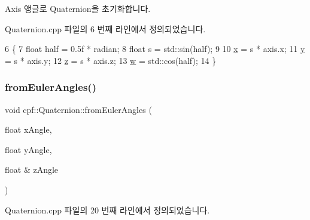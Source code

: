 Axis 앵글로 Quaternion을 초기화합니다. 

Quaternion.\+cpp 파일의 6 번째 라인에서 정의되었습니다.


\begin{DoxyCode}
6                                                                     \{
7         \textcolor{keywordtype}{float} half = 0.5f * radian;
8         \textcolor{keywordtype}{float} s = std::sin(half);
9 
10         \hyperlink{classcpf_1_1_quaternion_a200f7bce4e673281af8cc7dd75cb0677}{x} = s * axis.x;
11         \hyperlink{classcpf_1_1_quaternion_a4fbade6e58be55a49c94e7f157988136}{y} = s * axis.y;
12         \hyperlink{classcpf_1_1_quaternion_ade9c41b717605118e5fdf95d96a843b4}{z} = s * axis.z;
13         \hyperlink{classcpf_1_1_quaternion_af312a196b39bb4903b876bc454ac15f8}{w} = std::cos(half);
14     \}
\end{DoxyCode}
\mbox{\label{classcpf_1_1_quaternion_a7cf9179b0d364d55c501666af142086a}} 
\subsubsection{\texorpdfstring{from\+Euler\+Angles()}{fromEulerAngles()}}
{\footnotesize\ttfamily void cpf\+::\+Quaternion\+::from\+Euler\+Angles (\begin{DoxyParamCaption}\item[{float}]{x\+Angle,  }\item[{float}]{y\+Angle,  }\item[{float \&}]{z\+Angle }\end{DoxyParamCaption})}



Quaternion.\+cpp 파일의 20 번째 라인에서 정의되었습니다.


